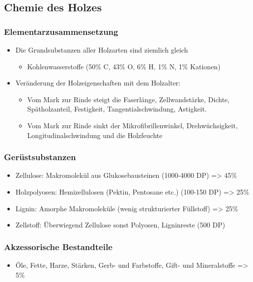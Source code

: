 \documentclass[12pt]{article}
\begin{document}
\subsection{Chemie des Holzes}
\subsubsection{Elementarzusammensetzung}
\begin{itemize}
  \item Die Grundsubstanzen aller Holzarten sind ziemlich gleich 
  \begin{itemize}
    \item Kohlenwasserstoffe (50\% C, 43\% O, 6\% H, 1\% N, 1\% Kationen)
  \end{itemize}
  \item Veränderung der Holzeigenschaften mit dem Holzalter:
  \begin{itemize}
    \item Vom Mark zur Rinde steigt die Faserlänge, Zellwandstärke, 
    Dichte, Spätholzanteil, Festigkeit, Tangentialschwindung, 
    Astigkeit.
    \item Vom Mark zur Rinde sinkt der Mikrofibrillenwinkel, 
    Drehwüchsigkeit, Longitudinalschwindung und die Holzfeuchte
    \end{itemize}
\end{itemize}



\subsubsection{Gerüstsubstanzen}
\begin{itemize}
  \item Zellulose: Makromolekül aus Glukosebausteinen (1000-4000 DP) => 45\%
  \item Holzpolyosen: Hemizellulosen (Pektin, Pentosane etc.) (100-150 DP) =>
  25\%
  \item Lignin: Amorphe Makromoleküle (wenig strukturierter Füllstoff) => 25\%
  \item Zellstoff: Überwiegend Zellulose sonst Polyosen, Ligninreste (500 DP)

\end{itemize}




\subsubsection{Akzessorische Bestandteile}
\begin{itemize}
  \item Öle, Fette, Harze, Stärken, Gerb- und Farbstoffe, Gift- und
  Mineralstoffe => 5\%
\end{itemize}
\end{document}
